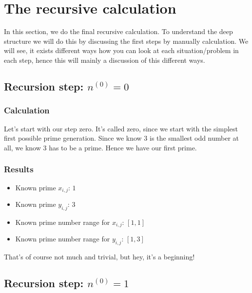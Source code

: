 \chapter{The recursive calculation}
\label{ch:therecursivecalculation}
\minitoc
In this section, we do the final recursive calculation. To understand the deep structure we will do this by discussing the first steps by manually calculation. We will see, it exists different ways how you can look at each situation/problem in each step, hence this will mainly a discussion of this different ways.
\section{Recursion step: $n^{\left(0\right)} = 0$}
\label{s:recursionstepn0_0}
\subsection{Calculation}
\label{ss:calcualtionstepn0_0}
Let's start with our step zero. It's called zero, since we start with the simplest first possible prime generation. Since we know $3$ is the smallest odd number at all, we know $3$ has to be a prime. Hence we have our first prime.
\subsection{Results}
\label{ss:resultsstepn0_0}
\begin{itemize}
	\item Known prime $x_{i,j}$: $1$
	\item Known prime $y_{i,j}$: $3$
	\item Known prime number range for $x_{i,j}$: $[1,1]$
	\item Known prime number range for $y_{i,j}$: $[1,3]$
\end{itemize}

That's of course not much and trivial, but hey, it's a beginning!
\section{Recursion step: $n^{\left(0\right)} = 1$}
\label{s:recursionstepn0_1}
